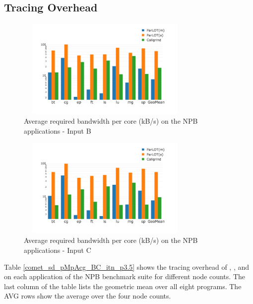 
\subsection{Tracing Overhead}
\label{subsec:lowtoh}


\begin{figure}[t]
\centering
\includegraphics[width=3.4in,height=1.9in]{figs.comet.newMed/comet_chartAvg_bw_B_p3_5.png}
\caption{  Average required bandwidth per core (kB/s) on the NPB applications - Input B}
\label{comet_chartAvg_bw_B_p3_5}
\end{figure}

\begin{figure}[t]
\centering
\includegraphics[width=3.4in,height=1.9in]{figs.comet.newMed/comet_chartAvg_bw_C_p3_5.png}
\caption{ Average required bandwidth per core (kB/s) on the NPB applications - Input C}
\label{comet_chartAvg_bw_C_p3_5}
\end{figure}


Table \ref{comet_sd_pMpAcg_BC_itn_p3.5} shows the tracing overhead of \parlotm, \parlota, and \callgrind on each application of the NPB benchmark suite for different node counts. The last column of the table lists the geometric mean over all eight programs. The AVG rows show the average over the four node counts.


